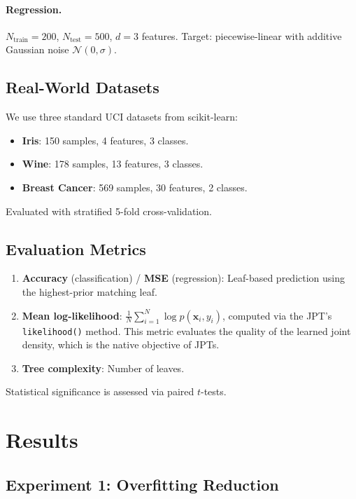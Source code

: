 \documentclass[11pt,a4paper]{article}
\begin{document}
\paragraph{Regression.}
$N_{\text{train}} = 200$, $N_{\text{test}} = 500$, $d = 3$ features. Target:
piecewise-linear with additive Gaussian noise $\mathcal{N}(0, \sigma)$.

\subsection{Real-World Datasets}

We use three standard UCI datasets from scikit-learn:
\begin{itemize}
    \item \textbf{Iris}: 150 samples, 4 features, 3 classes.
    \item \textbf{Wine}: 178 samples, 13 features, 3 classes.
    \item \textbf{Breast Cancer}: 569 samples, 30 features, 2 classes.
\end{itemize}
Evaluated with stratified 5-fold cross-validation.

\subsection{Evaluation Metrics}

\begin{enumerate}
    \item \textbf{Accuracy} (classification) / \textbf{MSE} (regression):
          Leaf-based prediction using the highest-prior matching leaf.
    \item \textbf{Mean log-likelihood}: $\frac{1}{N}\sum_{i=1}^{N} \log p(\mathbf{x}_i, y_i)$,
          computed via the JPT's \texttt{likelihood()} method. This metric
          evaluates the quality of the learned joint density, which is the
          native objective of JPTs.
    \item \textbf{Tree complexity}: Number of leaves.
\end{enumerate}

Statistical significance is assessed via paired $t$-tests.

\section{Results}
\label{sec:results}

\subsection{Experiment 1: Overfitting Reduction}
\end{document}

